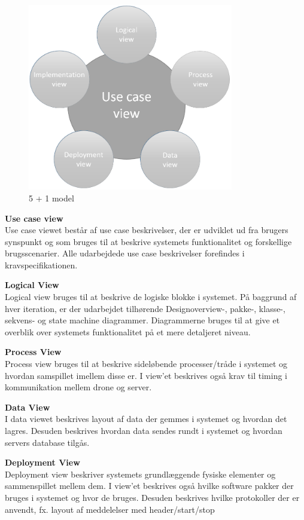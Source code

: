 \begin{figure}[H]
	\centering
	\includegraphics[width=0.8\textwidth]{Billeder/Udviklingsproces/n+1}
	\caption{5 + 1 model}
	\label{fig:n+1}
\end{figure}

\newpage


\textbf{Use case view}\\
Use case viewet består af use case beskrivelser, der er udviklet ud fra brugers synspunkt og som bruges til at beskrive systemets funktionalitet og forskellige brugsscenarier. Alle udarbejdede use case beskrivelser forefindes i kravspecifikationen.

\textbf{Logical View}\\
Logical view bruges til at beskrive de logiske blokke i systemet. På baggrund af hver iteration, er der udarbejdet tilhørende Designoverview-, pakke-, klasse-, sekvens- og state machine diagrammer. Diagrammerne bruges til at give et overblik over systemets funktionalitet på et mere detaljeret niveau.

\textbf{Process View}\\
Process view bruges til at beskrive sideløbende processer/tråde i systemet og hvordan samspillet imellem disse er. I view'et beskrives også krav til timing i kommunikation mellem drone og server.

\textbf{Data View}\\
I data viewet beskrives layout af data der gemmes i systemet og hvordan det lagres. Desuden beskrives hvordan data sendes rundt i systemet og hvordan servers database tilgås.

\textbf{Deployment View}\\
Deployment view beskriver systemets grundlæggende fysiske elementer og sammenspillet mellem dem. I view'et beskrives også hvilke software pakker der bruges i systemet og hvor de bruges. Desuden beskrives hvilke protokoller der er anvendt, fx. layout af meddelelser med header/start/stop

